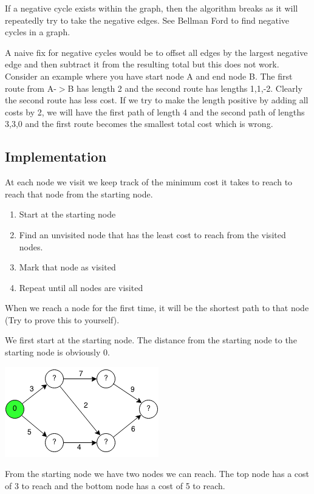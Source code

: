 \documentclass[11pt,oneside]{book}
\makeatletter
\def\maxwidth#1{\ifdim\Gin@nat@width>#1 #1\else\Gin@nat@width\fi}
\makeatother
\begin{document}
If a negative cycle exists within the graph, then the algorithm breaks as it will repeatedly try to take the negative edges. See Bellman Ford to find negative cycles in a graph.

A naive fix for negative cycles would be to offset all edges by the largest negative edge and then subtract it from the resulting total but this does not work. Consider an example where you have start node A and end node B. The first route from A-$>$B has length 2 and the second route has lengths 1,1,-2. Clearly the second route has less cost. If we try to make the length positive by adding all costs by 2, we will have the first path of length 4 and the second path of lengths 3,3,0 and the first route becomes the smallest total cost which is wrong.

\subsection{Implementation}

At each node we visit we keep track of the minimum cost it takes to reach to reach that node from the starting node.

\begin{enumerate}
\item Start at the starting node
\item Find an unvisited node that has the least cost to reach from the visited nodes.
\item Mark that node as visited
\item Repeat until all nodes are visited
\end{enumerate}

When we reach a node for the first time, it will be the shortest path to that node (Try to prove this to yourself).

We first start at the starting node. The distance from the starting node to the starting node is obviously 0.

\vspace{5px}\includegraphics[width=\maxwidth{\textwidth}]{djikstra.png}

From the starting node we have two nodes we can reach. The top node has a cost of 3 to reach and the bottom node has a cost of 5 to reach.
\end{document}
